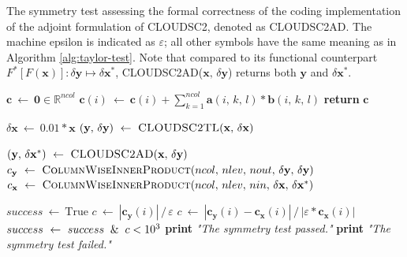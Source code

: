 \documentclass[gmd,manuscript,online]{copernicus}
\theoremstyle{theorem}
\theoremstyle{definition}
\theoremstyle{remark}
\theoremstyle{proposition}
\begin{document}
	\begin{algorithm}[t!]
		\caption{The symmetry test assessing the formal correctness of the coding implementation of the adjoint formulation of CLOUDSC2, denoted as \textsc{CLOUDSC2AD}. The machine epsilon is indicated as $\varepsilon$; all other symbols have the same meaning as in Algorithm \ref{alg:taylor-test}. Note that compared to its functional counterpart $F^* \left[ F \left( \boldsymbol{x} \right) \right] : \delta \boldsymbol{y} \mapsto \delta \boldsymbol{x}^*$, \textsc{CLOUDSC2AD($\mathbf{x}, \, \delta \mathbf{y}$)} returns both $\mathbf{y}$ and $\delta \mathbf{x}^*$.}
		\label{alg:symmetry-test}

		\begin{algorithmic}[1]
			 
			\State $\boldsymbol{c} ~ \gets ~ \mathbf{0} \in \mathbb{R}^{ncol}$
					\State $\boldsymbol{c}(i) ~ \gets ~ \boldsymbol{c}(i) + \sum_{k=1}^{ncol} \mathbf{a} \left( i, \, k, \, l \right) * \mathbf{b} \left( i, \, k, \, l \right)$
				\EndFor
			\EndFor
			\State \textbf{return} $\boldsymbol{c}$
			\EndFunction

			\Statex

			 

			\State $\delta \mathbf{x} ~ \gets ~ 0.01 * \mathbf{x}$
			\State $\left( \mathbf{y}, \, \delta \mathbf{y} \right) ~ \gets ~ \Call{CLOUDSC2TL}{\mathbf{x}, \, \delta \mathbf{x}}$ 

			\State $\left( \mathbf{y}, \, \delta \mathbf{x}^* \right) ~ \gets ~ \Call{CLOUDSC2AD}{\mathbf{x}, \, \delta \mathbf{y}}$ 
			\State $\boldsymbol{c}_{\mathbf{y}} ~ \gets ~ \Call{ColumnWiseInnerProduct}{ncol, \, nlev, \, nout, \, \delta \mathbf{y}, \, \delta \mathbf{y}}$
			\State $\boldsymbol{c}_{\mathbf{x}} ~ \gets ~ \Call{ColumnWiseInnerProduct}{ncol, \, nlev, \, nin, \, \delta \mathbf{x}, \, \delta \mathbf{x}^*}$

			\State $success ~ \gets ~ \text{True}$
					\State $c ~ \gets ~ \left| \boldsymbol{c}_{\mathbf{y}}(i) \right| \, / \, \varepsilon$
				\Else
					\State $c ~ \gets ~ \left| \boldsymbol{c}_{\mathbf{y}}(i) - \boldsymbol{c}_{\mathbf{x}}(i) \right| \, / \, \left| \varepsilon * \boldsymbol{c}_{\mathbf{x}}(i) \right|$
				\EndIf
				\State $success ~ \gets ~ success \And c < 10^3$
			\EndFor
				\State \textbf{print} \emph{"The symmetry test passed."}
			\Else
				\State \textbf{print} \emph{"The symmetry test failed."}
			\EndIf
			\EndProcedure
		\end{algorithmic}
	\end{algorithm}
\end{document}
